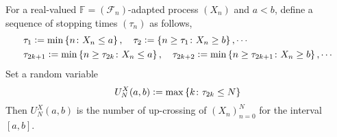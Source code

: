 For a real-valued $\mathbb{F} = (\mathcal{F}_n)$-adapted process $(X_n)$ and $a < b$, define a sequence of stopping times $(\tau_n)$ as follows,
\begin{equation*}
    \begin{aligned}
        &\tau_1 \vcentcolon= \min\left\{n \colon X_n \leq a\right\},\quad \tau_2 \vcentcolon= \left\{ n \geq \tau_1  \colon X_n \geq b\right\}, \cdots \\
        &\tau_{2k + 1} \vcentcolon= \min\left\{n \geq \tau_{2k} \colon X_n \leq a\right\},\quad \tau_{2k + 2} \vcentcolon= \min\left\{n \geq \tau_{2k+1} \colon X_n \geq b\right\},\cdots
    \end{aligned}
\end{equation*}
Set a random variable
\begin{equation*}
    U_N^X(a,b) \vcentcolon= \max \left\{k \colon \tau_{2k} \leq N\right\}
\end{equation*}
Then $U_N^X(a,b)$ is the number of up-crossing of $(X_n)_{n=0}^N$ for the interval $[a,b]$.

